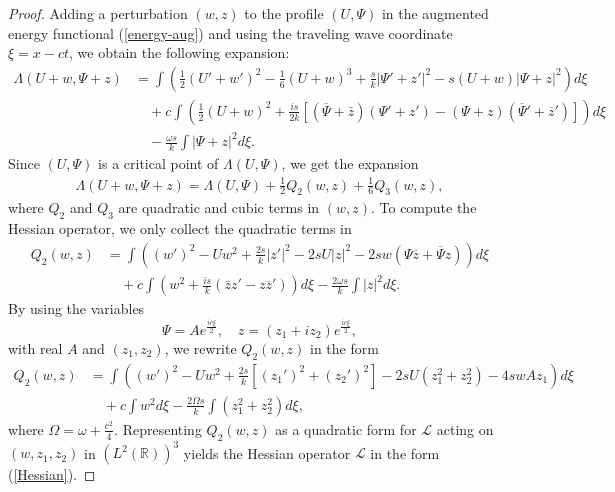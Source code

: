 \documentclass[12pt,reqno]{amsart}
\numberwithin{equation}{section}
\begin{document}
\begin{proof}
Adding a perturbation $(w,z)$ to the profile $(U,\Psi)$ in the augmented energy 
functional (\ref{energy-aug}) and using the traveling wave coordinate $\xi = x - ct$, we obtain the following expansion:
\begin{align*}
\Lambda(U+w,\Psi+z) &= \int\left( \frac{1}{2}(U'+w')^2-\frac{1}{6}(U+w)^3 
+ \frac{s}{k} \vert \Psi' + z' \vert^2 - s(U+w) \vert \Psi + z \vert^2 \right) d\xi \\
& \quad + c\int\left(\frac{1}{2}(U+w)^2 
+ \frac{i s}{2k} [(\overline{\Psi} + \bar{z})(\Psi' + z') - (\Psi + z)(\overline{\Psi}' + \overline{z}')] \right) d\xi \\
& \quad -\frac{\omega s}{k} \int \vert \Psi + z \vert^2 d \xi.
\end{align*}
Since $(U,\Psi)$ is a critical point of $\Lambda(U,\Psi)$, we get the expansion 
\begin{align*}
\Lambda(U+w,\Psi+z) = \Lambda(U,\Psi) + \frac{1}{2} Q_2(w,z) + \frac{1}{6} Q_3(w,z),
\end{align*}
where $Q_2$ and $Q_3$ are quadratic and cubic terms in $(w,z)$. To compute the Hessian operator, we only collect the quadratic terms in 
\begin{align*}
Q_2(w,z) &= \int\left( (w')^2 -  U w^2 
+ \frac{2 s}{k} \vert z' \vert^2 - 2 s U \vert z \vert^2 - 2 s w (\Psi \overline{z} + \overline{\Psi} z) \right) d \xi \\
& \quad + c\int\left( w^2 + \frac{i s}{k} (\bar{z} z' - z \overline{z}') \right) d\xi 
-\frac{2 \omega s}{k} \int \vert z \vert^2 d \xi.
\end{align*}
By using the variables 
\begin{equation}
    \label{variables-Psi-z}
\Psi = A e^{\frac{ic \xi}{2}}, \quad z = (z_1 + i z_2) e^{\frac{ic \xi}{2}},
\end{equation}
with real $A$ and $(z_1,z_2)$, we rewrite $Q_2(w,z)$ in the form
\begin{align*}
Q_2(w,z) &= \int\left( (w')^2 -  U w^2 
+ \frac{2 s}{k} [(z_1')^2 + (z_2')^2] - 2 s U (z_1^2 + z_2^2) - 4 s w A z_1 \right) d \xi \\
& \quad + c \int w^2 d\xi - \frac{2 \Omega s}{k} \int (z_1^2 + z_2^2) d \xi, 
\end{align*}
where $\Omega = \omega  +\frac{c^2}{4}$. Representing $Q_2(w,z)$ as a quadratic form for $\mathcal{L}$ acting on $(w,z_1,z_2)$ in $(L^2(\mathbb{R}))^3$
yields the Hessian operator $\mathcal{L}$ in the form (\ref{Hessian}). 
\end{proof}
\end{document}
